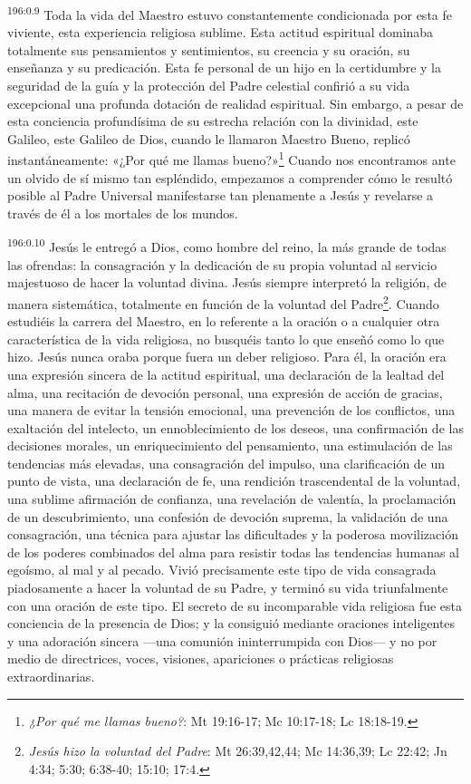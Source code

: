 \par
\textsuperscript{196:0.9} Toda la vida del Maestro estuvo constantemente condicionada por esta fe viviente, esta experiencia religiosa sublime. Esta actitud espiritual dominaba totalmente sus pensamientos y sentimientos, su creencia y su oración, su enseñanza y su predicación. Esta fe personal de un hijo en la certidumbre y la seguridad de la guía y la protección del Padre celestial confirió a su vida excepcional una profunda dotación de realidad espiritual. Sin embargo, a pesar de esta conciencia profundísima de su estrecha relación con la divinidad, este Galileo, este Galileo de Dios, cuando le llamaron Maestro Bueno, replicó instantáneamente: «¿Por qué me llamas bueno?»\footnote{\textit{¿Por qué me llamas bueno?}: Mt 19:16-17; Mc 10:17-18; Lc 18:18-19.} Cuando nos encontramos ante un olvido de sí mismo tan espléndido, empezamos a comprender cómo le resultó posible al Padre Universal manifestarse tan plenamente a Jesús y revelarse a través de él a los mortales de los mundos.

\par
\textsuperscript{196:0.10} Jesús le entregó a Dios, como hombre del reino, la más grande de todas las ofrendas: la consagración y la dedicación de su propia voluntad al servicio majestuoso de hacer la voluntad divina. Jesús siempre interpretó la religión, de manera sistemática, totalmente en función de la voluntad del Padre\footnote{\textit{Jesús hizo la voluntad del Padre}: Mt 26:39,42,44; Mc 14:36,39; Lc 22:42; Jn 4:34; 5:30; 6:38-40; 15:10; 17:4.}. Cuando estudiéis la carrera del Maestro, en lo referente a la oración o a cualquier otra característica de la vida religiosa, no busquéis tanto lo que enseñó como lo que hizo. Jesús nunca oraba porque fuera un deber religioso. Para él, la oración era una expresión sincera de la actitud espiritual, una declaración de la lealtad del alma, una recitación de devoción personal, una expresión de acción de gracias, una manera de evitar la tensión emocional, una prevención de los conflictos, una exaltación del intelecto, un ennoblecimiento de los deseos, una confirmación de las decisiones morales, un enriquecimiento del pensamiento, una estimulación de las tendencias más elevadas, una consagración del impulso, una clarificación de un punto de vista, una declaración de fe, una rendición trascendental de la voluntad, una sublime afirmación de confianza, una revelación de valentía, la proclamación de un descubrimiento, una confesión de devoción suprema, la validación de una consagración, una técnica para ajustar las dificultades y la poderosa movilización de los poderes combinados del alma para resistir todas las tendencias humanas al egoísmo, al mal y al pecado. Vivió precisamente este tipo de vida consagrada piadosamente a hacer la voluntad de su Padre, y terminó su vida triunfalmente con una oración de este tipo. El secreto de su incomparable vida religiosa fue esta conciencia de la presencia de Dios; y la consiguió mediante oraciones inteligentes y una adoración sincera ---una comunión ininterrumpida con Dios--- y no por medio de directrices, voces, visiones, apariciones o prácticas religiosas extraordinarias.

